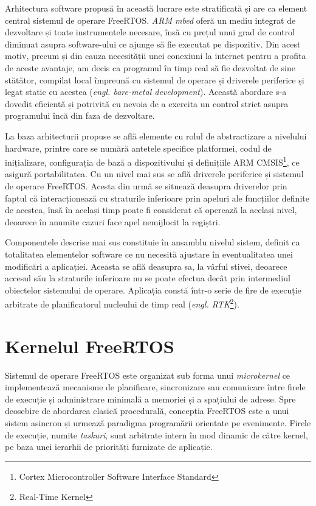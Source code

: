 Arhitectura software propusă în această lucrare este stratificată și are ca element central sistemul de operare FreeRTOS. \textit{ARM mbed} oferă un mediu integrat de dezvoltare și toate instrumentele necesare, însă cu prețul unui grad de control diminuat asupra software-ului ce ajunge să fie executat pe dispozitiv. Din acest motiv, precum și din cauza necesității unei conexiuni la internet pentru a profita de aceste avantaje, am decis ca programul în timp real să fie dezvoltat de sine stătător, compilat local împreună cu sistemul de operare și driverele periferice și legat static cu acestea (\textit{engl. bare-metal development}). Această abordare s-a dovedit eficientă și potrivită cu nevoia de a exercita un control strict asupra programului încă din faza de dezvoltare.


La baza arhitecturii propuse se află elemente cu rolul de abstractizare a \mbox{nivelului} hardware, printre care se numără antetele specifice platformei, codul de inițializare, configurația de bază a dispozitivului și definițiile ARM CMSIS\footnote{Cortex Microcontroller Software Interface Standard}, ce \mbox{asigură} portabilitatea. Cu un nivel mai sus se află driverele periferice și \mbox{sistemul} de \mbox{operare} FreeRTOS. Acesta din urmă se situează deasupra driverelor prin \mbox{faptul} că interacționează cu straturile inferioare prin apeluri ale funcțiilor definite de \mbox{acestea}, însă în același timp poate fi considerat că operează la același nivel, \mbox{deoarece} în anumite cazuri face apel nemijlocit la regiștri.

Componentele descrise mai sus constituie în ansamblu nivelul sistem, definit ca totalitatea elementelor software ce nu necesită ajustare în eventualitatea unei modificări a aplicației. Aceasta se află deasupra sa, la vârful stivei, deoarece accesul său la straturile inferioare nu se poate efectua decât prin intermediul obiectelor sistemului de operare. Aplicația constă într-o serie de fire de execuție arbitrate de planificatorul nucleului de timp real (\textit{engl. RTK}\footnote{Real-Time Kernel}).



\section{Kernelul FreeRTOS}

Sistemul de operare FreeRTOS este organizat sub forma unui \textit{microkernel} ce \mbox{implementează} mecanisme de planificare, sincronizare sau comunicare între \mbox{firele} de execuție și administrare minimală a memoriei și a spațiului de adrese. Spre \mbox{deosebire} de abordarea clasică procedurală, concepția FreeRTOS este a unui \mbox{sistem} asincron și urmează paradigma programării orientate pe evenimente. \mbox{Firele} de execuție, numite \textit{taskuri}, sunt arbitrate intern în mod dinamic de \mbox{către} kernel, pe baza unei ierarhii de priorități furnizate de aplicație. \cite{freertos1}

